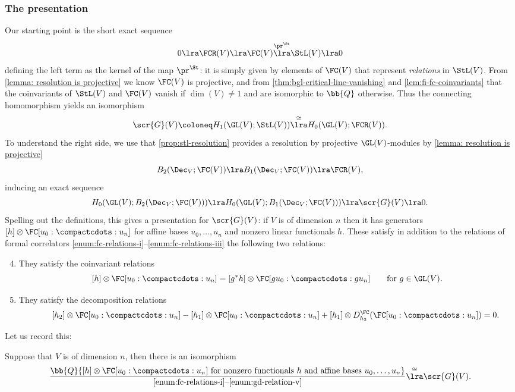 \documentclass[a4paper]{amsart}
\begin{document}
\subsubsection{The presentation} Our starting point is the short exact sequence
\[0 \lra \FCR(V) \lra \FC(V) \overset{\pr^\St}\lra \StL(V) \lra 0\]
defining the left term as the kernel of the map $\pr^\St$: it is simply given by elements of $\FC(V)$ that represent \emph{relations} in $\StL(V)$. From \cref{lemma: resolution is projective} we know $\FC(V)$ is projective, and from \cref{thm:bgl-critical-line-vanishing} and \cref{lem:fi-fc-coinvariants} that the coinvariants of $\StL(V)$ and $\FC(V)$ vanish if $\dim(V) \neq 1$ and are isomorphic to $\bb{Q}$ otherwise. Thus the connecting homomorphism yields an isomorphism
\[\scr{G}(V) \coloneq H_1(\GL(V);\StL(V)) \overset{\cong}\lra H_0(\GL(V);\FCR(V)).\]
To understand the right side, we use that \cref{prop:stl-resolution} provides a resolution by projective $\GL(V)$-modules by \cref{lemma: resolution is projective}
\[B_2(\Dec_V;\FC(V)) \lra B_1(\Dec_V;\FC(V)) \lra \FCR(V),\]
inducing an exact sequence
\[H_0(\GL(V);B_2(\Dec_V;\FC(V))) \lra H_0(\GL(V);B_1(\Dec_V;\FC(V))) \lra \scr{G}(V) \lra 0.\]
Spelling out the definitions, this gives a presentation for $\scr{G}(V)$: if $V$ is of dimension $n$ then it has generators $[h] \otimes \FC[u_0:\compactcdots:u_n]$ for affine bases $u_0,\ldots,u_n$ and nonzero linear functionals $h$. These satisfy in addition to the relations of formal correlators \eqref{enum:fc-relations-i}--\eqref{enum:fc-relations-iii} the following two relations:
\begin{enumerate}[\noindent (1)] \setcounter{enumi}{3}
    \item \label{enum:gd-relation-iv} They satisfy the coinvariant relations
    \[[h] \otimes \FC[u_0:\compactcdots:u_n] = [g^*h] \otimes \FC[gu_0:\compactcdots:gu_n] \qquad \text{for $g \in \GL(V)$}.\]
    \item \label{enum:gd-relation-v} They satisfy the decomposition relations 
    \[\qquad [h_2] \otimes \FC[u_0:\compactcdots:u_n]-[h_1] \otimes \FC[u_0:\compactcdots:u_n]+[h_1] \otimes D^\FC_{h_2}(\FC[u_0:\compactcdots:u_n])=0.\]
\end{enumerate}
Let us record this:

\begin{proposition}\label{prop:presentation for G(F)} Suppose that $V$ is of dimension $n$, then there is an isomorphism
\[\frac{\bb{Q}\{[h] \otimes \FC[u_0:\compactcdots:u_n] \text{ for nonzero functionals $h$ and affine bases $u_0,\ldots,u_n$}\}}{\text{\eqref{enum:fc-relations-i}--\eqref{enum:gd-relation-v}}} \overset{\cong}\lra \scr{G}(V).\] 
\end{proposition}
\end{document}
